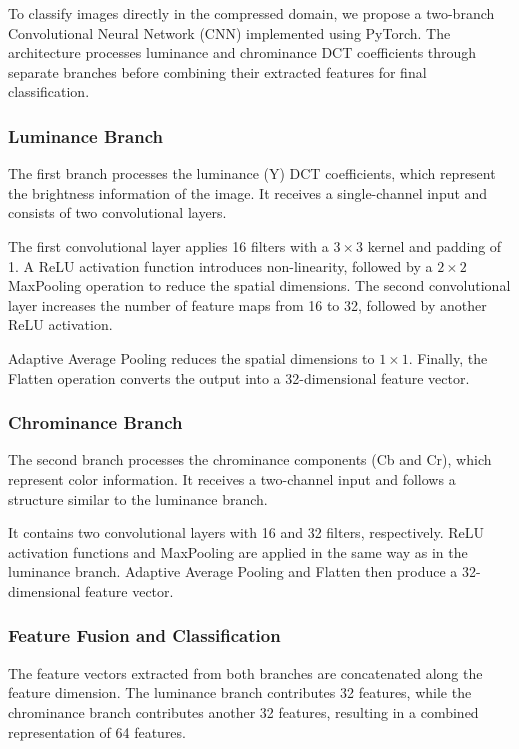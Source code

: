 \documentclass[11pt]{article}
\begin{document}
To classify images directly in the compressed domain, we propose
a two-branch Convolutional Neural Network (CNN) implemented using
PyTorch. The architecture processes luminance and chrominance
DCT coefficients through separate branches before combining
their extracted features for final classification.

\subsubsection{Luminance Branch}

The first branch processes the luminance (Y) DCT coefficients,
which represent the brightness information of the image.
It receives a single-channel input and consists of two
convolutional layers.

The first convolutional layer applies 16 filters with a
$3 \times 3$ kernel and padding of 1. A ReLU activation
function introduces non-linearity, followed by a
$2 \times 2$ MaxPooling operation to reduce the spatial
dimensions. The second convolutional layer increases the
number of feature maps from 16 to 32, followed by another
ReLU activation.

Adaptive Average Pooling reduces the spatial dimensions
to $1 \times 1$. Finally, the Flatten operation converts
the output into a 32-dimensional feature vector.

\subsubsection{Chrominance Branch}

The second branch processes the chrominance components
(Cb and Cr), which represent color information.
It receives a two-channel input and follows a structure
similar to the luminance branch.

It contains two convolutional layers with 16 and 32 filters,
respectively. ReLU activation functions and MaxPooling
are applied in the same way as in the luminance branch.
Adaptive Average Pooling and Flatten then produce
a 32-dimensional feature vector.

\subsubsection{Feature Fusion and Classification}

The feature vectors extracted from both branches are
concatenated along the feature dimension. The luminance
branch contributes 32 features, while the chrominance
branch contributes another 32 features, resulting in
a combined representation of 64 features.
\end{document}
